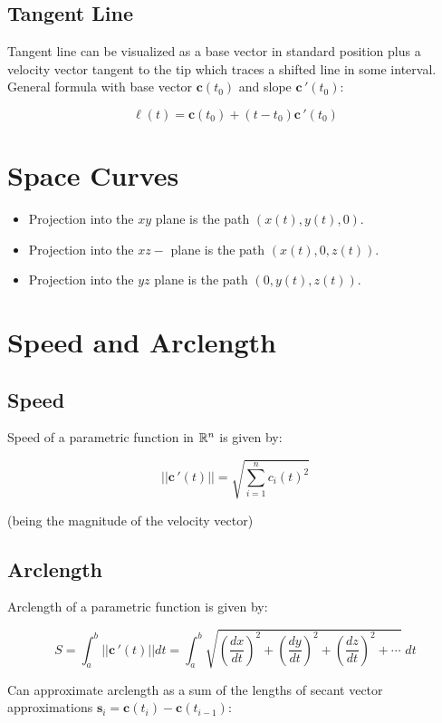 \subsection{Tangent Line}

Tangent line can be visualized as a base vector in standard position plus a velocity vector
tangent to the tip which traces a shifted line in some interval. General formula with base vector $\textbf{c}(t_0)$ and slope $\textbf{c}\,'(t_0)$:

\[\boxed{\ell(t)=\textbf{c}(t_0)+(t-t_0)\textbf{c}\,'(t_0)}\]

\section{Space Curves}

\begin{itemize}
    \item Projection into the $x y$ plane is the path $(x(t), y(t), 0)$.
    \item Projection into the $x z-$ plane is the path $(x(t), 0, z(t))$.
    \item Projection into the $y z$ plane is the path $(0, y(t), z(t))$.
\end{itemize}

\section{Speed and Arclength}

\subsection{Speed}

Speed of a parametric function in $\mathbb{R}^n$ is given by:

$$||\textbf{c}\,'(t)||=\sqrt{\displaystyle\sum_{i=1}^{n}c_i(t)^2}$$

(being the magnitude of the velocity vector)

\subsection{Arclength}

Arclength of a parametric function is given by:

\[S=\int_a^b ||\textbf{c}\,'(t)||dt=\int_a^b\sqrt{(\frac{dx}{dt})^2+(\frac{dy}{dt})^2+(\frac{dz}{dt})^2+\cdots}\;dt\]

Can approximate arclength as a sum of the lengths of secant vector approximations
$\textbf{s}_i=\textbf{c}(t_i)-\textbf{c}(t_{i-1})$:


